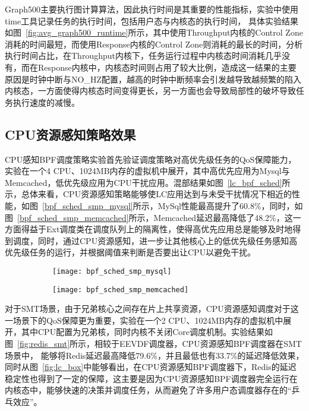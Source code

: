 Graph500主要执行图计算算法，因此执行时间是其重要的性能指标，实验中使用time工具记录任务的执行时间，包括用户态与内核态的执行时间， 具体实验结果如图~\ref{fig:avg_graph500_runtime}所示，其中使用Throughput内核的Control Zone消耗的时间最短，而使用Response内核的Control Zone则消耗的最长的时间，分析执行时间占比，在Throughput内核下，任务运行过程中内核态时间消耗几乎没有，而在Response内核中，内核态时间则占用了较大比例，造成这一结果的主要原因是时钟中断与NO\_HZ配置，越高的时钟中断频率会引发越导致越频繁的陷入内核态，一方面使得内核态时间变得更长，另一方面也会导致局部性的破坏导致任务执行速度的减慢。

\subsection{CPU资源感知策略效果}


CPU感知BPF调度策略实验首先验证调度策略对高优先级任务的QoS保障能力，实验在一个4 CPU、1024MB内存的虚拟机中展开，其中高优先应用为Mysql与Memcached，低优先级应用为CPU干扰应用。混部结果如图~\ref{lc_bpf_sched}所示，总体来看，CPU资源感知策略能够使LC应用达到与未受干扰情况下相近的性能，如图~\ref{bpf_sched_smp_mysql}所示，MySql性能最高提升了60.8\%，同时，如图~\ref{bpf_sched_smp_memcached}所示，Memcached延迟最高降低了48.2\%，这一方面得益于Ext调度类在调度队列上的隔离性，使得高优先应用总是能够及时地得到调度，同时，通过CPU资源感知，进一步让其他核心上的低优先级任务感知高优先级任务的运行，并根据阈值来判断是否要出让CPU以避免干扰。

\begin{figure}[H]
    \centering
    \begin{subfigure}[b]{0.49\textwidth}
        \texttt{[image: bpf\_sched\_smp\_mysql]}
        \label{fig:bpf_sched_smp_mysql}
    \end{subfigure}
    \begin{subfigure}[b]{0.49\textwidth}
        \texttt{[image: bpf\_sched\_smp\_memcached]}
        \label{fig:bpf_sched_smp_memcached}
    \end{subfigure}
\label{fig:lc_bpf_sched}
\end{figure}

对于SMT场景，由于兄弟核心之间存在片上共享资源，CPU资源感知调度对于这一场景下的QoS保障更为重要，实验在一个2 CPU、1024MB内存的虚拟机中展开，其中CPU配置为兄弟核，同时内核不关闭Core调度机制。实验结果如图~\ref{fig:redis_smt}所示，相较于EEVDF调度器，CPU资源感知BPF调度器在SMT场景中， 能够将Redis延迟最高降低79.6\%，并且最低也有33.7\%的延迟降低效果，同时从图~\ref{fig:lc_box}中能够看出，在CPU资源感知BPF调度器下，Redis的延迟稳定性也得到了一定的保障，这主要是因为CPU资源感知BPF调度器完全运行在内核态中，能够快速的决策并调度任务，从而避免了许多用户态调度器存在的“乒乓效应”。

